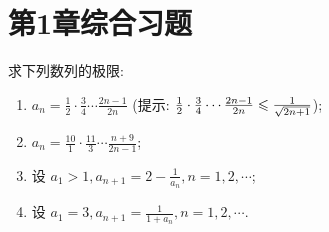 \section{第1章综合习题}

\begin{exercise}[1.C.1]
    求下列数列的极限:
    \begin{enumerate}[(1)]
        \item $a_n = \frac{1}{2} \cdot \frac{3}{4} \cdots \frac{2n-1}{2n}$ (提示: $\frac{1}{2} \cdot \frac{3}{4} \cdots \frac{2n-1}{2n} \leqslant \frac{1}{\sqrt{2n+1}}$);
        \item $a_n = \frac{10}{1} \cdot \frac{11}{3} \cdots \frac{n+9}{2n-1}$;
        \item 设 $a_1 > 1,  a_{n+1} = 2 - \frac{1}{a_n},  n=1, 2, \cdots$;
        \item 设 $a_1 = 3,  a_{n+1} = \frac{1}{1+a_n},  n=1, 2, \cdots$.
    \end{enumerate}
\end{exercise}

